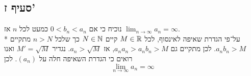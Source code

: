 \subsection{סעיף ז'}
נוכיח כי אם $0 < b_n < a_n$ כמעט לכל $n$ אז $\lim_{n \to \infty} a_n = \infty$. \\*
על־פי הגדרת שאיפה לאינסוף, לכל $M \in \mathbb{R}$ קיים $N \in \mathbb{N}$ כך שלכל $n > N$ מתקיים $a_n b_n > M$.
לכן מתקיים גם $a_n a_n > a_n b_n > M$, אז $a_n > \sqrt{M}$. נגדיר $M' = \sqrt{M}$ ואנו רואים כי הגדרת השאיפה חלה על $(a_n)$.
לכן
$$
	\lim_{n \to \infty} a_n = \infty
$$

